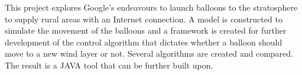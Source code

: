 This project explores Google's endeavours to launch balloons to the stratosphere to supply rural areas with an Internet connection. A model is constructed to simulate the movement of the balloons and a framework is created for further development of the control algorithm that dictates whether a balloon should move to a new wind layer or not. Several algorithms are created and compared. The result is a JAVA tool that can be further built upon. 